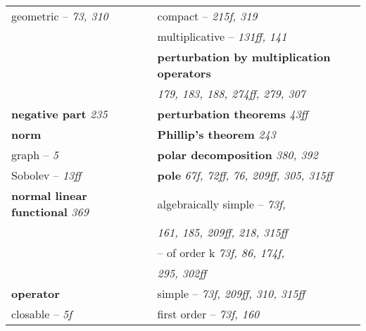 \begin{longtable}{p{}p{}}
\quad geometric -- \textit{73, 310} & \quad compact -- \textit{215f, 319} \\
& \quad multiplicative -- \textit{131ff, 141} \\
& \textbf{perturbation by multiplication operators} \\
& \quad \textit{179, 183, 188, 274ff, 279, 307} \\
\textbf{negative part} \textit{235} & \textbf{perturbation theorems} \textit{43ff} \\
\textbf{norm} & \textbf{Phillip's theorem} \textit{243} \\
\quad graph -- \textit{5} & \textbf{polar decomposition} \textit{380, 392} \\
\quad Sobolev -- \textit{13ff} & \textbf{pole} \textit{67f, 72ff, 76, 209ff, 305, 315ff} \\
\textbf{normal linear functional} \textit{369} & \quad algebraically simple -- \textit{73f,} \\
& \quad\quad \textit{161, 185, 209ff, 218, 315ff} \\
& \quad -- of order k \textit{73f, 86, 174f,} \\
& \quad\quad \textit{295, 302ff} \\
\textbf{operator} & \quad simple -- \textit{73f, 209ff, 310, 315ff} \\
\quad closable -- \textit{5f} & \quad first order -- \textit{73f, 160} \\


\end{longtable}
